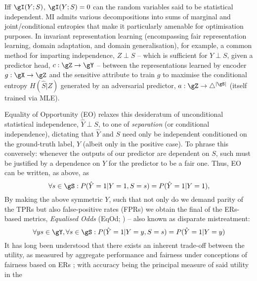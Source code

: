 Iff \( \gI(Y;S)\), \( \gI(Y;S) = 0  \) can the random variables said to be statistical independent.
%
MI admits various decompositions into sums of marginal and joint/conditional entropies that make it
particularly amenable for optimisation purposes. 
%
In invariant representation learning (encompassing fair representation learning, domain adaptation,
and domain generalisation), for example, a common method for imparting independence, \(Z \perp S \)
-- which is sufficient for \(Y \perp S\), given a predictor head, \(c: \gZ \to \gY \) -- between
the representations learned by encoder \(g: \gX \to \gZ \) and the sensitive attribute to train
\(g\) to maximise the conditional entropy \( H(\hat{S}|Z) \) generated by an adversarial predictor,
\(a: \gZ \to \bigtriangleup^{|\gS|}\) (itself trained via MLE).

%
%
Equality of Opportunity (EO) relaxes this desideratum of unconditional statistical independence,
\(\hat{Y} \perp S\), to one of \emph{separation} (or conditional independence), dictating that
\(\hat{Y}\) and \(S\) need only be independent conditioned on the ground-truth label, \(Y\) (albeit
only in the positive case).
%
To phrase this conversely: whenever the outputs of our predictor are dependent on \(S\), such must be
justified by a dependence on \(Y\) for the predictor to be a fair one.
%
Thus, EO can be written, as above, as
%
\begin{equation}
    \forall s \in \gS: P( \hat{Y}=1|Y=1, S=s ) = P(\hat{Y}=1|Y=1),
\end{equation}
%
%
By making the above symmetric \wrt{} \(Y\), such that not only do we demand parity of the TPRs but
also false-positive rates (FPRs) we obtain the final of the ERs-based metrics, \emph{Equalised
Odds} (EqOd; \cite{hardt2016equality}) -- also known as disparate mistreatment:
%
\begin{equation}
    \forall y s \in \gY, \forall s \in \gS: P( \hat{Y}=1|Y=y, S=s ) = P( \hat{Y}=1|Y=y )
\end{equation}
%
%
It has long been understood that there exists an inherent trade-off between the utility, as
measured by aggregate performance and fairness under conceptions of fairness based on ERs
\citep{kaplow1999conflict}; with accuracy being the principal measure of said utility in the
